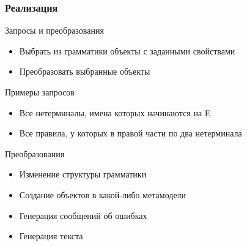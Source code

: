 \documentclass[paper=screen,10pt,unicode]{beamer}
\begin{document}
\begin{frame}
	\frametitle{Реализация}
	\begin{block}{Запросы и преобразования}
		\begin{itemize}
			\item Выбрать из грамматики объекты с заданными свойствами
			\item Преобразовать выбранные объекты
		\end{itemize}
	\end{block}
	\begin{block}{}
		Примеры запросов
		\begin{itemize}
			\item Все нетерминалы, имена которых начинаются на E
			\item Все правила, у которых в правой части по два нетерминала
		\end{itemize}
	\end{block}
	\begin{block}{Преобразования}
		\begin{itemize}
			\item Изменение структуры грамматики
			\item Создание объектов в какой-либо метамодели
			\item Генерация сообщений об ошибках
			\item Генерация текста
		\end{itemize}
	\end{block}
\end{frame}
\end{document}

